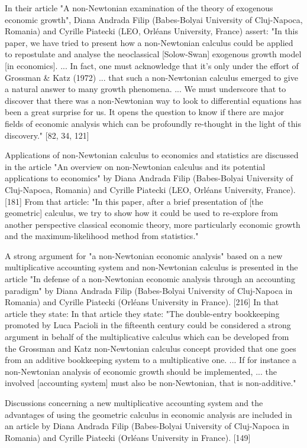 \documentclass[12pt]{article}
\begin{document}
In their article "A non-Newtonian examination of the theory of exogenous economic growth", Diana Andrada Filip (Babes-Bolyai University of Cluj-Napoca, Romania) and Cyrille Piatecki (LEO, Orléans University, France) assert: "In this paper, we have tried to present how a non-Newtonian calculus could be applied to repostulate and analyse the neoclassical [Solow-Swan] exogenous growth model [in economics]. ... In fact, one must acknowledge that it’s only under the effort of Grossman & Katz (1972) ... that such a non-Newtonian calculus emerged to give a natural answer to many growth phenomena. ... We must underscore that to discover that there was a non-Newtonian way to look to differential equations has been a great surprise for us. It opens the question to know if there are major fields of economic analysis which can be profoundly re-thought in the light of this discovery." [82, 34, 121]

Applications of non-Newtonian calculus to economics and statistics are discussed in the article "An overview on non-Newtonian calculus and its potential applications to economics" by Diana Andrada Filip (Babes-Bolyai University of Cluj-Napoca, Romania) and Cyrille Piatecki (LEO, Orléans University, France). [181] From that article: "In this paper, after a brief presentation of [the geometric] calculus, we try to show how it could be used to re-explore from another perspective classical economic theory, more particularly economic growth and the maximum-likelihood method from statistics."

A strong argument for "a non-Newtonian economic analysis" based on a new multiplicative accounting system and non-Newtonian calculus is presented in the article "In defense of a non-Newtonian economic analysis through an accounting paradigm" by Diana Andrada Filip (Babes-Bolyai University of Cluj-Napoca in Romania) and Cyrille Piatecki (Orléans University in France). [216] In that article they state: In that article they state: "The double-entry bookkeeping promoted by Luca Pacioli in the fifteenth century could be considered a strong argument in behalf of the multiplicative calculus which can be developed from the Grossman and Katz non-Newtonian calculus concept provided that one goes from an additive bookkeeping system to a multiplicative one. ... If for instance a non-Newtonian analysis of economic growth should be implemented, ... the involved [accounting system] must also be non-Newtonian, that is non-additive."

Discussions concerning a new multiplicative accounting system and the advantages of using the geometric calculus in economic analysis are included in an article by Diana Andrada Filip (Babes-Bolyai University of Cluj-Napoca in Romania) and Cyrille Piatecki (Orléans University in France). [149] 
\end{document}
